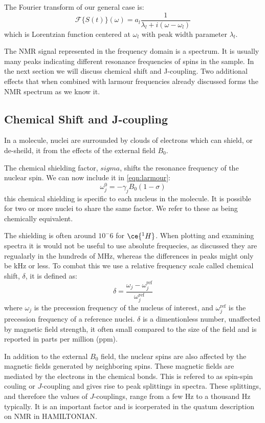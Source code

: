 The Fourier transform of our general case is:
\begin{equation}
  \mathcal{F}\{S(t)\}(\omega) = a_l\frac{1}{\lambda_l + i(\omega - \omega_l)}
\end{equation}
which is Lorentzian function centered at $\omega_l$ with peak width parameter $\lambda_l$.

The NMR signal represented in the frequency domain is a spectrum. It is usually many peaks
indicating different resonance frequencies of spins in the sample. In the next
section we will discuss chemical shift and J-coupling. Two additional effects that when combined
with larmour frequencies already discussed forms the NMR spectrum as we know it.

\subsection{Chemical Shift and J-coupling}

In a molecule, nuclei are surrounded by clouds of electrons which can shield, or de-sheild, it
from the effects of the external field $B_0$.

The chemical shielding factor, $sigma$, shifts the resonance frequency of the nuclear spin. We
can now include it in \ref{eqn:larmour}:
\begin{equation}
  \omega_j^0 = -\gamma_jB_0(1-\sigma)
\end{equation}
this chemical shielding is specific to each nucleus in the molecule. It is possible
for two or more nuclei to share the same factor. We refer to these as being chemically equivalent.

The shielding is often around $10^-6$ for $\ce{^1H}$. When plotting and examining spectra
it is would not be useful to use absolute frequecies, as discussed they are regualarly in the hundreds of MHz,
whereas the differences in peaks might only be kHz or less. To combat this we use a relative frequency scale
called chemical shift, $\delta$, it is defined as:
\begin{equation}
  \delta = \frac{\omega_j-\omega^\text{ref}_j}{\omega^\text{ref}_j}
\end{equation}
where $\omega_j$ is the precession frequency of the nucleus of interest, and $\omega^\text{ref}_j$ is the precession
frequency of a reference nuclei. $\delta$ is a dimentionless number, unaffected by magnetic field strength, it often
small compared to the size of the field and is reported in parts per million (ppm).

In addition to the external $B_0$ field, the nuclear spins are also affected by the magnetic fields generated
by neighboring spins. These magnetic fields are mediated by the electrons in the chemical bonds. This is refered to as
spin-spin couling or $J$-coupling and gives rise to peak splittings in spectra. These splittings, and therefore the values of $J$-couplings, range from a few Hz to a thousand Hz typically. It is an important factor and is icorperated
in the quatum description on NMR in HAMILTONIAN.

